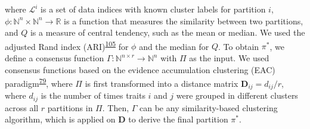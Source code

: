\documentclass[
  a4paper,
]{article}
\begin{document}
where \(\mathcal{L}^i\) is a set of data indices with known cluster labels for partition \(i\),
\(\phi\colon \mathbb{N}^n \times \mathbb{N}^n \to \mathbb{R}\) is a function that measures the similarity between two partitions,
and \(Q\) is a measure of central tendency, such as the mean or median.
We used the adjusted Rand index (ARI)\textsuperscript{\protect\hyperlink{ref-e4AuoW8N}{105}} for \(\phi\) and the median for \(Q\).
To obtain \(\pi^*\), we define a consensus function \(\Gamma\colon \mathbb{N}^{n \times r} \to \mathbb{N}^n\) with \(\Pi\) as the input.
We used consensus functions based on the evidence accumulation clustering (EAC) paradigm\textsuperscript{\protect\hyperlink{ref-cuROQDFa}{79}}, where \(\Pi\) is first transformed into a distance matrix
\(\mathbf{D}_{ij} = d_{ij} / r\),
where \(d_{ij}\) is the number of times traits \(i\) and \(j\) were grouped in different clusters across all \(r\) partitions in \(\Pi\).
Then, \(\Gamma\) can be any similarity-based clustering algorithm, which is applied on \(\mathbf{D}\) to derive the final partition \(\pi^*\).
\end{document}
